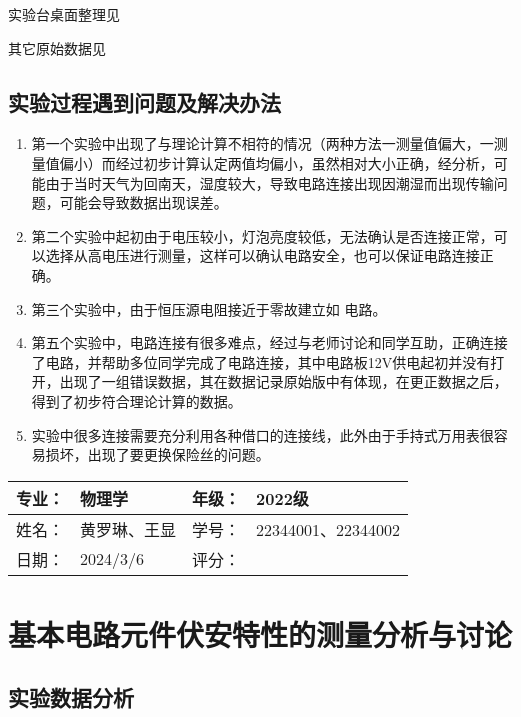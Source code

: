 \documentclass[dvipsnames, svgnames,a4paper,11pt]{article}
\begin{document}
	实验台桌面整理见%
	
	其它原始数据见%
	
	\subsection{实验过程遇到问题及解决办法}
	\begin{enumerate}
		\item 第一个实验中出现了与理论计算不相符的情况（两种方法一测量值偏大，一测量值偏小）而经过初步计算认定两值均偏小，虽然相对大小正确，经分析，可能由于当时天气为回南天，湿度较大，导致电路连接出现因潮湿而出现传输问题，可能会导致数据出现误差。
		\item 第二个实验中起初由于电压较小，灯泡亮度较低，无法确认是否连接正常，可以选择从高电压进行测量，这样可以确认电路安全，也可以保证电路连接正确。
		\item 第三个实验中，由于恒压源电阻接近于零故建立如  电路。
		\item 第五个实验中，电路连接有很多难点，经过与老师讨论和同学互助，正确连接了电路，并帮助多位同学完成了电路连接，其中电路板12V供电起初并没有打开，出现了一组错误数据，其在数据记录原始版中有体现，在更正数据之后，得到了初步符合理论计算的数据。
		\item 实验中很多连接需要充分利用各种借口的连接线，此外由于手持式万用表很容易损坏，出现了要更换保险丝的问题。
	\end{enumerate}
	
	
	
	\clearpage
	
	\begin{table}
		\renewcommand\arraystretch{1.7}
		\begin{tabularx}{\textwidth}{|X|X|X|X|}
			\hline
			专业：& 物理学 &年级：& 2022级\\
			\hline
			姓名： & 黄罗琳、王显 & 学号：& 22344001、22344002\\
			\hline
			日期：& 2024/3/6 & 评分： &\\
			\hline
		\end{tabularx}
	\end{table}
	
	\section{基本电路元件伏安特性的测量\quad\heiti 分析与讨论}
	
	\subsection{实验数据分析}
	
\end{document}
